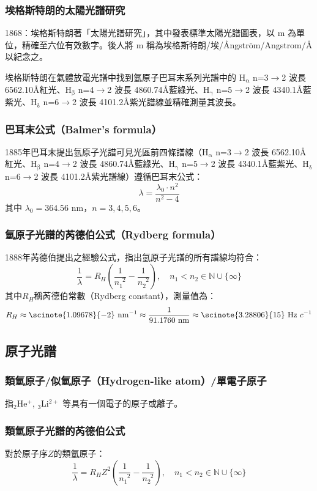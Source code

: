 \documentclass[a4paper,12pt]{report}
\begin{document}
\subsubsection{埃格斯特朗的太陽光譜研究}
1868：埃格斯特朗著「太陽光譜研究」，其中發表標準太陽光譜圖表，以  m 為單位，精確至六位有效數字。後人將  m 稱為埃格斯特朗/埃/Ångström/Angstrom/\AA 以紀念之。

埃格斯特朗在氣體放電光譜中找到氫原子巴耳末系列光譜中的 H$_\text{α}$ n=3$\rightarrow$2 波長 6562.10\AA 紅光、H$_\text{β}$ n=4$\rightarrow$2 波長 4860.74\AA 藍綠光、H$_\text{γ}$ n=5$\rightarrow$2 波長 4340.1\AA 藍紫光、H$_\text{δ}$ n=6$\rightarrow$2 波長 4101.2\AA 紫光譜線並精確測量其波長。
\subsubsection{巴耳末公式（Balmer's formula）}
1885年巴耳末提出氫原子光譜可見光區前四條譜線（H$_\text{α}$ n=3$\rightarrow$2 波長 6562.10\AA 紅光、H$_\text{β}$ n=4$\rightarrow$2 波長 4860.74\AA 藍綠光、H$_\text{γ}$ n=5$\rightarrow$2 波長 4340.1\AA 藍紫光、H$_\text{δ}$ n=6$\rightarrow$2 波長 4101.2\AA 紫光譜線）遵循巴耳末公式：
\[\lambda = \frac{\lambda_0 \cdot n^2}{n^2 - 4}\]
其中 $\lambda_0 = 364.56$ nm，$n = 3, 4, 5, 6$。
\subsubsection{氫原子光譜的芮德伯公式（Rydberg formula）}
1888年芮德伯提出之經驗公式，指出氫原子光譜的所有譜線均符合：
\[\frac{1}{\lambda} = R_H \left( \frac{1}{n_1^{\phantom{1}2}} - \frac{1}{n_2^{\phantom{2}2}} \right),\quad n_1<n_2\in\mathbb{N}\cup\{\infty\}\]
其中$R_H$稱芮德伯常數（Rydberg constant），測量值為：
\[R_H\approx\scinote{1.09678}{-2}\text{\ nm}^{-1}\approx\frac{1}{91.1760\text{\ nm}}\approx\scinote{3.28806}{15}\text{\ Hz\ }c^{-1}\]
\subsection{原子光譜}
\subsubsection{類氫原子/似氫原子（Hydrogen-like atom）/單電子原子}
指$_2$He$^+$, $_3$Li$^{2+}$ 等具有一個電子的原子或離子。
\subsubsection{類氫原子光譜的芮德伯公式}
對於原子序$Z$的類氫原子：
\[\frac{1}{\lambda} = R_HZ^2 \left( \frac{1}{n_1^{\phantom{1}2}} - \frac{1}{n_2^{\phantom{2}2}} \right),\quad n_1<n_2\in\mathbb{N}\cup\{\infty\}\]
\end{document}
